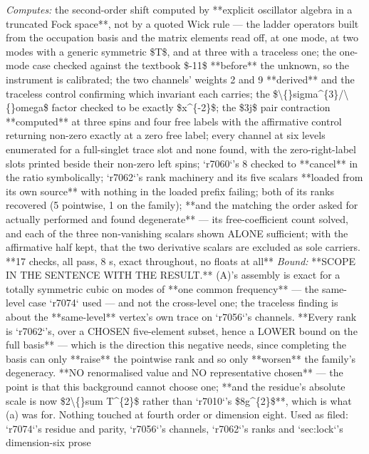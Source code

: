 \begin{description}
\emph{Computes:} the second-order shift computed by **explicit oscillator algebra in a truncated Fock space**, not by a quoted Wick rule --- the ladder operators built from the occupation basis and the matrix elements read off, at one mode, at two modes with a generic symmetric \$T\$, and at three with a traceless one; the one-mode case checked against the textbook \$-11\$ **before** the unknown, so the instrument is calibrated; the two channels' weights 2 and 9 **derived** and the traceless control confirming which invariant each carries; the \$\textbackslash\{\}sigma\textasciicircum{}\{3\}/\textbackslash\{\}omega\$ factor checked to be exactly \$x\textasciicircum{}\{-2\}\$; the \$3j\$ pair contraction **computed** at three spins and four free labels with the affirmative control returning non-zero exactly at a zero free label; every channel at six levels enumerated for a full-singlet trace slot and none found, with the zero-right-label slots printed beside their non-zero left spins; `r7060`'s 8 checked to **cancel** in the ratio symbolically; `r7062`'s rank machinery and its five scalars **loaded from its own source** with nothing in the loaded prefix failing; both of its ranks recovered (5 pointwise, 1 on the family); **and the matching the order asked for actually performed and found degenerate** --- its free-coefficient count solved, and each of the three non-vanishing scalars shown ALONE sufficient; with the affirmative half kept, that the two derivative scalars are excluded as sole carriers. **17 checks, all pass, 8 s, exact throughout, no floats at all**
 \emph{Bound:}  **SCOPE IN THE SENTENCE WITH THE RESULT.** (A)'s assembly is exact for a totally symmetric cubic on modes of **one common frequency** --- the same-level case `r7074` used --- and not the cross-level one; the traceless finding is about the **same-level** vertex's own trace on `r7056`'s channels.  **Every rank is `r7062`'s, over a CHOSEN five-element subset, hence a LOWER bound on the full basis** --- which is the direction this negative needs, since completing the basis can only **raise** the pointwise rank and so only **worsen** the family's degeneracy.  **NO renormalised value and NO representative chosen** --- the point is that this background cannot choose one; **and the residue's absolute scale is now \$2\textbackslash\{\}sum T\textasciicircum{}\{2\}\$ rather than `r7010`'s \$8g\textasciicircum{}\{2\}\$**, which is what (a) was for. Nothing touched at fourth order or dimension eight. Used as filed: `r7074`'s residue and parity, `r7056`'s channels, `r7062`'s ranks and `sec:lock`'s dimension-six prose

\end{description}
